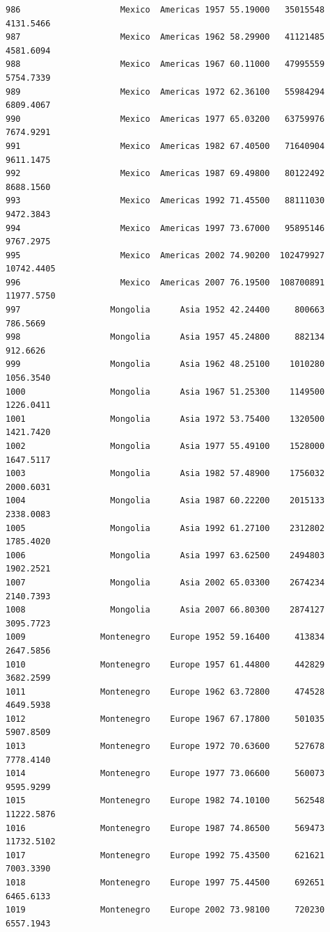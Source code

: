 \documentclass[
  letterpaper,
  DIV=11,
  numbers=noendperiod]{scrreprt}
\begin{document}
\begin{verbatim}
986                    Mexico  Americas 1957 55.19000   35015548   4131.5466
987                    Mexico  Americas 1962 58.29900   41121485   4581.6094
988                    Mexico  Americas 1967 60.11000   47995559   5754.7339
989                    Mexico  Americas 1972 62.36100   55984294   6809.4067
990                    Mexico  Americas 1977 65.03200   63759976   7674.9291
991                    Mexico  Americas 1982 67.40500   71640904   9611.1475
992                    Mexico  Americas 1987 69.49800   80122492   8688.1560
993                    Mexico  Americas 1992 71.45500   88111030   9472.3843
994                    Mexico  Americas 1997 73.67000   95895146   9767.2975
995                    Mexico  Americas 2002 74.90200  102479927  10742.4405
996                    Mexico  Americas 2007 76.19500  108700891  11977.5750
997                  Mongolia      Asia 1952 42.24400     800663    786.5669
998                  Mongolia      Asia 1957 45.24800     882134    912.6626
999                  Mongolia      Asia 1962 48.25100    1010280   1056.3540
1000                 Mongolia      Asia 1967 51.25300    1149500   1226.0411
1001                 Mongolia      Asia 1972 53.75400    1320500   1421.7420
1002                 Mongolia      Asia 1977 55.49100    1528000   1647.5117
1003                 Mongolia      Asia 1982 57.48900    1756032   2000.6031
1004                 Mongolia      Asia 1987 60.22200    2015133   2338.0083
1005                 Mongolia      Asia 1992 61.27100    2312802   1785.4020
1006                 Mongolia      Asia 1997 63.62500    2494803   1902.2521
1007                 Mongolia      Asia 2002 65.03300    2674234   2140.7393
1008                 Mongolia      Asia 2007 66.80300    2874127   3095.7723
1009               Montenegro    Europe 1952 59.16400     413834   2647.5856
1010               Montenegro    Europe 1957 61.44800     442829   3682.2599
1011               Montenegro    Europe 1962 63.72800     474528   4649.5938
1012               Montenegro    Europe 1967 67.17800     501035   5907.8509
1013               Montenegro    Europe 1972 70.63600     527678   7778.4140
1014               Montenegro    Europe 1977 73.06600     560073   9595.9299
1015               Montenegro    Europe 1982 74.10100     562548  11222.5876
1016               Montenegro    Europe 1987 74.86500     569473  11732.5102
1017               Montenegro    Europe 1992 75.43500     621621   7003.3390
1018               Montenegro    Europe 1997 75.44500     692651   6465.6133
1019               Montenegro    Europe 2002 73.98100     720230   6557.1943

\end{verbatim}
\end{document}
